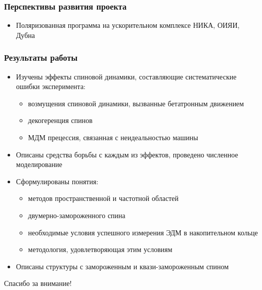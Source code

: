 \documentclass[14pt]{beamer}
\begin{document}
\begin{frame}
\frametitle{Перспективы развития проекта}
\begin{itemize}
  \item Поляризованная программа на ускорительном комплексе НИКА, ОИЯИ, Дубна
\end{itemize}
\end{frame}

\begin{frame}
\frametitle{Результаты работы}
\begin{itemize}
  \item Изучены эффекты спиновой динамики, составляющие систематические ошибки эксперимента:
  \begin{itemize}
  	\item возмущения спиновой динамики, вызванные бетатронным движением
  	\item декогеренция спинов
  	\item МДМ прецессия, связанная с неидеальностью машины
  \end{itemize}
  \item Описаны средства борьбы с каждым из эффектов, проведено численное моделирование
\end{itemize}
\end{frame}
\begin{frame}
	\begin{itemize}
		  \item Сформулированы понятия:
		\begin{itemize}
			\item методов пространственной и частотной областей
			\item двумерно-замороженного спина
			\item необходимые условия успешного измерения ЭДМ в накопительном кольце
			\item методология, удовлетворяющая этим условиям
		\end{itemize}
		\item Описаны структуры с замороженным и квази-замороженным спином
	\end{itemize}
\end{frame}

\begin{frame}
\begin{center}
Спасибо за внимание!
\end{center}
\end{frame}
\end{document}
